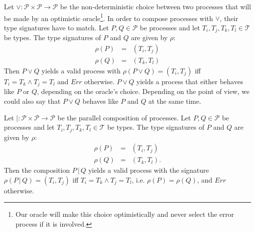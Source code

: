\begin{definition}
\label{def:static_choice}
Let $\vee \colon \mathcal{P} \times \mathcal{P} \to \mathcal{P}$ be the non-deterministic choice between two processes that will be made by an optimistic oracle\footnote{Our oracle will make this choice optimistically and never select the error process if it is involved.}. In order to compose processes with $\vee$, their type signatures have to match. Let $P, Q \in \mathcal{P}$ be processes and let $T_i, T_j, T_k, T_l \in \mathcal{T}$ be types. The type signatures of $P$ and $Q$ are given by $\rho$:
\begin{eqnarray}
  \rho \left( P \right) & = & \left( T_i, T_j \right) \\
  \rho \left( Q \right) & = & \left( T_k, T_l \right)
\end{eqnarray}
Then $P \vee Q$ yields a valid process with $\rho \left( P \vee Q \right) = \left( T_i, T_j \right)$ iff $T_i = T_k \wedge T_j = T_l$ and $Err$ otherwise. $P \vee Q$ yields a process that either behaves like $P$ or $Q$, depending on the oracle's choice. Depending on the point of view, we could also say that $P \vee Q$ behaves like $P$ and $Q$ at the same time.

\hfill\qedsymbol
\end{definition}


\begin{definition}
Let $| \colon \mathcal{P} \times \mathcal{P} \to \mathcal{P}$ be the parallel composition of processes. Let $P, Q \in \mathcal{P}$ be processes and let $T_i, T_j, T_k, T_l \in \mathcal{T}$ be types. The type signatures of $P$ and $Q$ are given by $\rho$:
\begin{eqnarray*}
  \rho \left( P \right) & = & \left( T_i, T_j \right) \\
  \rho \left( Q \right) & = & \left( T_k, T_l \right).
\end{eqnarray*}
Then the composition $P \,|\, Q$ yields a valid process with the signature $\rho \left( P \,|\, Q \right) = \left( T_i, T_j \right)$ iff $T_i = T_k \wedge T_j = T_l$, i.e. $\rho \left( P \right) = \rho \left( Q \right)$, and $Err$ otherwise.

\hfill\qedsymbol
\end{definition}


